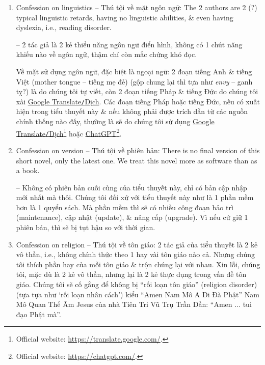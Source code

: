 \documentclass[12pt,oneside]{book}
\begin{document}
\begin{enumerate}
	\item {\sf Confession on linguistics -- Thú tội về mặt ngôn ngữ}: The 2 authors are 2 (?) typical linguistic retards, having no linguistic abilities, \& even having dyslexia, i.e., reading disorder.
	
	-- 2 tác giả là 2 kẻ thiểu năng ngôn ngữ điển hình, không có 1 chút năng khiếu nào về ngôn ngữ, thậm chí còn mắc chứng khó đọc.
	
	Về mặt sử dụng ngôn ngữ, đặc biệt là ngoại ngữ: 2 đoạn tiếng Anh {\sf[en]} \& tiếng Việt {\sf[vi]} (mother tongue -- tiếng mẹ đẻ) (gộp chung lại thì tựa như {\it envy} -- ganh tỵ?) là do chúng tôi tự viết, còn 2 đoạn tiếng Pháp {\sf[fr]} \& tiếng Đức {\sf[de]} do chúng tôi xài \href{https://translate.google.com}{\sf Google Translate{\tt/}Dịch}. Các đoạn tiếng Pháp hoặc tiếng Đức, nếu có xuất hiện trong tiểu thuyết này \& nếu không phải được trích dẫn từ các nguồn chính thống nào đấy, thường là sẽ do chúng tôi sử dụng \href{https://translate.google.com}{\sf Google Translate{\tt/}Dịch}\footnote{Official website: \url{https://translate.google.com/}.} hoặc \href{https://chatgpt.com/}{\sf ChatGPT}\footnote{Official website: \url{https://chatgpt.com/}.}.
	
	\item {\sf Confession on version -- Thú tội về phiên bản}: There is no final version of this short novel, only the latest one. We treat this novel more as software than as a book.
	
	-- Không có phiên bản cuối cùng của tiểu thuyết này, chỉ có bản cập nhập mới nhất mà thôi. Chúng tôi đối xử với tiểu thuyết này như là 1 phần mềm hơn là 1 quyển sách. Mà phần mềm thì sẽ có nhiều công đoạn bảo trì (maintenance), cập nhật (update), \& nâng cấp (upgrade). Vì nếu cứ giữ 1 phiên bản, thì sẽ bị tụt hậu so với thời gian.
	\item {\sf Confession on religion -- Thú tội về tôn giáo}: 2 tác giả của tiểu thuyết là 2 kẻ vô thần, i.e., không chính thức theo 1 hay vài tôn giáo nào cả. Nhưng chúng tôi thích phần hay của mỗi tôn giáo \& trộn chúng lại với nhau. Xin lỗi, chúng tôi, mặc dù là 2 kẻ vô thần, nhưng lại là 2 kẻ thực dụng trong vấn đề tôn giáo. Chúng tôi sẽ cố gắng để không bị ``rối loạn tôn giáo'' (religion disorder) (tựa tựa như `rối loạn nhân cách') kiểu ``Amen Nam Mô A Di Đà Phật'' Nam Mô Quan Thế Âm Jesus của nhà Tiên Tri Vũ Trụ {\sc Trần Dần}: ``Amen $\ldots$ tui đạo Phật mà''.
\end{enumerate}
\end{document}
